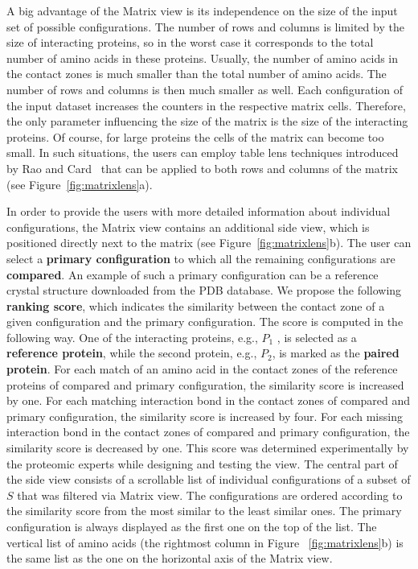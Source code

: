 \documentclass{bmcart}
\def\MatView {Matrix view\xspace}
\begin{document}
A big advantage of the \MatView is its independence on the size of the input set of possible configurations.
The number of rows and columns is limited by the size of interacting proteins, so in the worst case it corresponds to the total number of amino acids in these proteins.
Usually, the number of amino acids in the contact zones is much smaller than the total number of amino acids.
The number of rows and columns is then much smaller as well.
Each configuration of the input dataset increases the counters in the respective matrix cells.
Therefore, the only parameter influencing the size of the matrix is the size of the interacting proteins.
Of course, for large proteins the cells of the matrix can become too small.
In such situations, the users can employ table lens techniques introduced by Rao and Card~\cite{Rao1994} that can be applied to both rows and columns of the matrix (see Figure~\ref{fig:matrixlens}a).

In order to provide the users with more detailed information about individual configurations, the \MatView contains an additional side view, which is positioned directly next to the matrix (see Figure~\ref{fig:matrixlens}b).
The user can select a \textbf{primary configuration} to which all the remaining configurations are \textbf{compared}.
An example of such a primary configuration can be a reference crystal structure downloaded from the PDB database.
We propose the following \textbf{ranking score}, which indicates the similarity between the contact zone of a given configuration and the primary configuration.
The score is computed in the following way.
One of the interacting proteins, e.g., $P_1$ , is selected as a \textbf{reference protein}, while the second protein, e.g., $P_2$, is marked as the \textbf{paired protein}.
For each match of an amino acid in the contact zones of the reference proteins of compared and primary configuration, the similarity score is increased by one.
For each matching interaction bond in the contact zones of compared and primary configuration, the similarity score is increased by four.
For each missing interaction bond in the contact zones of compared and primary configuration, the similarity score is decreased by one.
This score was determined experimentally by the proteomic experts while designing and testing the view. 
The central part of the side view consists of a scrollable list of individual configurations of a subset of $S$ that was filtered via \MatView.
The configurations are ordered according to the similarity score from the most similar to the least similar ones.
The primary configuration is always displayed as the first one on the top of the list.
The vertical list of amino acids (the rightmost column in Figure ~\ref{fig:matrixlens}b) is the same list as the one on the horizontal axis of the \MatView.
\end{document}
